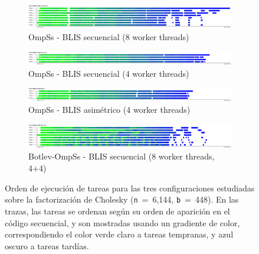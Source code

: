 \begin{figure}%
\centering
	\begin{subfigure}{\textwidth}
   \includegraphics[width=\textwidth]{Plots/Traces/sym_8cores_task_number.png}
		\caption{OmpSs - BLIS secuencial (8 worker threads)}
	\end{subfigure}
	\begin{subfigure}{\textwidth}
   \includegraphics[width=\textwidth]{Plots/Traces/sym_task_number.png}
		\caption{OmpSs - BLIS secuencial (4 worker threads)} 
	\end{subfigure}
	\begin{subfigure}{\textwidth}
   \includegraphics[width=\textwidth]{Plots/Traces/asym_task_number.png}
		\caption{OmpSs - BLIS asimétrico (4 worker threads)} 
	\end{subfigure}
	\begin{subfigure}{\textwidth}
   \includegraphics[width=\textwidth]{Plots/Traces/botlev_task_number.png}
		\caption{Botlev-OmpSs - BLIS secuencial (8 worker threads, 4+4)} 
	\end{subfigure}
	\caption[Orden de ejecución de tareas para las tres configuraciones estudiadas sobre la factorización de Cholesky ({\tt n}~=~6,144, {\tt b}~=~448).]{Orden de ejecución de tareas para las tres configuraciones estudiadas sobre la factorización de Cholesky
({\tt n}~=~6,144, {\tt b}~=~448). En las trazas, las tareas se ordenan según su orden de aparición
en el código secuencial, y son mostradas usando un gradiente de color, correspondiendo el color verde claro a tareas
	tempranas, y azul oscuro a tareas tardías.}
\label{fig:traces_task_number}
\end{figure}

